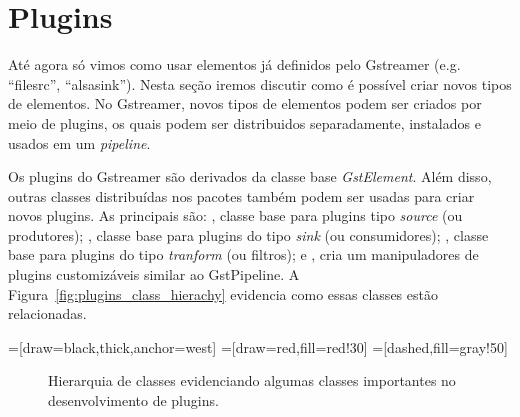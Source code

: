 \section{Plugins}
\label{sec:plugins}
Até agora só vimos como usar elementos já definidos pelo Gstreamer (e.g.
``filesrc'', ``alsasink'').  Nesta seção iremos discutir como é possível criar
novos tipos de elementos.  No Gstreamer, novos tipos de elementos podem ser
criados por meio de plugins, os quais podem ser distribuidos separadamente,
instalados e usados em um \emph{pipeline}. 



Os plugins do Gstreamer são derivados da classe base \emph{GstElement}.  Além
disso, outras classes distribuídas nos pacotes  também podem
ser usadas para criar novos plugins.  As principais são: , classe
base para plugins tipo \emph{source} (ou produtores); , classe
base para plugins do tipo \emph{sink} (ou consumidores); ,
classe base para plugins do tipo \emph{tranform} (ou filtros); e ,
cria um manipuladores de plugins customizáveis similar ao GstPipeline.  A
Figura~\ref{fig:plugins_class_hierachy} evidencia como essas classes estão
relacionadas.

=[draw=black,thick,anchor=west]
=[draw=red,fill=red!30]
=[dashed,fill=gray!50]
\begin{figure}[H]
  \centering
  \label{fig:plugins_class_hierarch}
  \caption{Hierarquia de classes evidenciando algumas classes importantes no
           desenvolvimento de plugins.}
\end{figure}

